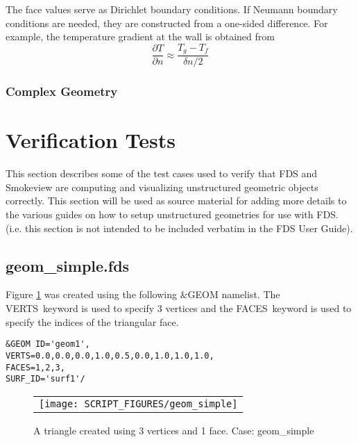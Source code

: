 \documentclass[12pt]{article}
\begin{document}
The face values serve as Dirichlet boundary conditions.  If Neumann boundary conditions are needed, they are constructed from a one-sided difference.  For example, the temperature gradient at the wall is obtained from
\begin{equation}
\frac{\partial T}{\partial n} \approx \frac{T_g - T_f}{\delta n/2}
\end{equation}

\subsubsection{Complex Geometry}






\section{Verification Tests}

This section describes some of the test cases used to verify that FDS and Smokeview are computing
and visualizing unstructured geometric objects correctly.  This section will be used as source material for adding
more details to the various guides on how to setup unstructured geometries for use with FDS. (i.e. this section
is not intended to be included verbatim in the FDS User Guide).

\newcommand{\figheightD}{2.75in}

\subsection{geom\_simple.fds}
Figure \ref{fig:geom_simple} was created using the following \&GEOM namelist.
The {\ct VERTS}\ keyword is used to specify 3 vertices and the {\ct FACES}\ keyword
is used to specify the indices of the triangular face.

{\small
\begin{verbatim}
&GEOM ID='geom1',
VERTS=0.0,0.0,0.0,1.0,0.5,0.0,1.0,1.0,1.0,
FACES=1,2,3,
SURF_ID='surf1'/
\end{verbatim}
}

\begin{figure}
\begin{center}
\begin{tabular}{c}
 \texttt{[image: SCRIPT\_FIGURES/geom\_simple]}
  \end{tabular}
\end{center}
 \caption{A triangle created using 3 vertices and 1 face. Case: geom\_simple}
\label{fig:geom_simple}
\end{figure}
\end{document}
